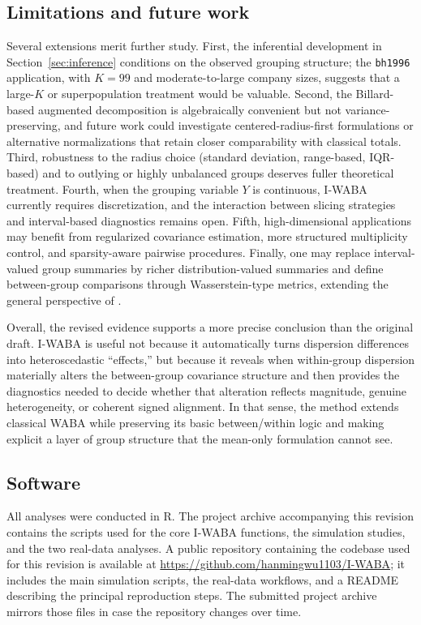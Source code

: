 \documentclass[preprint, times, 12pt, authoryear]{elsarticle}
\begin{document}
\subsection{Limitations and future work}

Several extensions merit further study. First, the inferential development in Section~\ref{sec:inference} conditions on the observed grouping structure; the \texttt{bh1996} application, with $K=99$ and moderate-to-large company sizes, suggests that a large-$K$ or superpopulation treatment would be valuable. Second, the Billard-based augmented decomposition is algebraically convenient but not variance-preserving, and future work could investigate centered-radius-first formulations or alternative normalizations that retain closer comparability with classical totals. Third, robustness to the radius choice (standard deviation, range-based, IQR-based) and to outlying or highly unbalanced groups deserves fuller theoretical treatment. Fourth, when the grouping variable $Y$ is continuous, I-WABA currently requires discretization, and the interaction between slicing strategies and interval-based diagnostics remains open. Fifth, high-dimensional applications may benefit from regularized covariance estimation, more structured multiplicity control, and sparsity-aware pairwise procedures. Finally, one may replace interval-valued group summaries by richer distribution-valued summaries and define between-group comparisons through Wasserstein-type metrics, extending the general perspective of \citet{matsui2016d3m}.

Overall, the revised evidence supports a more precise conclusion than the original draft. I-WABA is useful not because it automatically turns dispersion differences into heteroscedastic ``effects,'' but because it reveals when within-group dispersion materially alters the between-group covariance structure and then provides the diagnostics needed to decide whether that alteration reflects magnitude, genuine heterogeneity, or coherent signed alignment. In that sense, the method extends classical WABA while preserving its basic between/within logic and making explicit a layer of group structure that the mean-only formulation cannot see.


\subsection{Software}

All analyses were conducted in R. The project archive accompanying this revision contains the scripts used for the core I-WABA functions, the simulation studies, and the two real-data analyses. A public repository containing the codebase used for this revision is available at \url{https://github.com/hanmingwu1103/I-WABA}; it includes the main simulation scripts, the real-data workflows, and a README describing the principal reproduction steps. The submitted project archive mirrors those files in case the repository changes over time.



\end{document}
